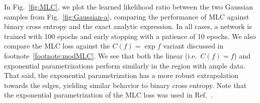 \documentclass[aps,prx,reprint,preprintnumbers,superscriptaddress,nofootinbib,longbibliography,floatfix]{revtex4-2}
\DeclareRobustCommand{\Fig}[1]{Fig.~\ref{fig:#1}}
\DeclareRobustCommand{\Ref}[1]{Ref.~\cite{#1}}
\begin{document}
In \Fig{MLC}, we plot the learned likelihood ratio between the two Gaussian samples from \Fig{Gaussian-a}, comparing the performance of MLC against binary cross entropy and the exact analytic expression.  In all cases, a network is trained with 100 epochs and early stopping with a patience of 10 epochs.
%
We also compare the MLC loss against the $C(f) = \exp f$ variant discussed in footnote~\ref{footnote:modMLC}.
%
We see that both the linear (i.e.~$C(f) = f$) and exponential parametrizations perform similarly in the region with ample data.
%
That said, the exponential parametrization has a more robust extrapolation towards the edges, yielding similar behavior to binary cross entropy.  
%
Note that the exponential parametrization of the MLC loss was used in \Ref{DAgnolo:2018cun}.




\end{document}
